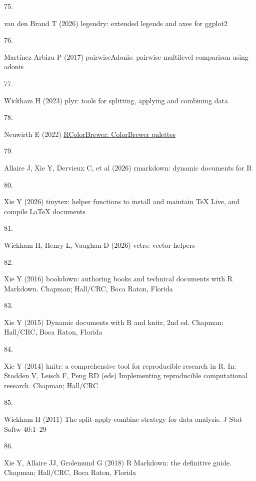 \documentclass[
  12 pt,
]{article}
\newlength{\cslhangindent}
\newlength{\csllabelwidth}
\newenvironment{CSLReferences}[2] %
 {\begin{list}{}{%
  \setlength{\itemindent}{0pt}
  \setlength{\leftmargin}{0pt}
  \setlength{\parsep}{0pt}
  \ifodd #1
   \setlength{\leftmargin}{\cslhangindent}
   \setlength{\itemindent}{-1\cslhangindent}
  \fi
  \setlength{\itemsep}{#2\baselineskip}}}
 {\end{list}}
\newcommand{\CSLLeftMargin}[1]{\parbox[t]{\csllabelwidth}{\strut#1\strut}}
\newcommand{\CSLRightInline}[1]{\parbox[t]{\linewidth - \csllabelwidth}{\strut#1\strut}}
\begin{document}
\begin{CSLReferences}{0}{0}
\CSLLeftMargin{75. }%
\CSLRightInline{{van den Brand T} (2026) {legendry}: {extended} legends and axes for ggplot2}

\CSLLeftMargin{76. }%
\CSLRightInline{Martinez Arbizu P (2017) pairwiseAdonis: {pairwise} multilevel comparison using adonis}

\CSLLeftMargin{77. }%
\CSLRightInline{Wickham H (2023) {plyr}: {tools} for splitting, applying and combining data}

\CSLLeftMargin{78. }%
\CSLRightInline{Neuwirth E (2022) \href{https://doi.org/10.32614/CRAN.package.RColorBrewer}{RColorBrewer: {ColorBrewer} palettes}}

\CSLLeftMargin{79. }%
\CSLRightInline{Allaire J, Xie Y, Dervieux C, et al (2026) {rmarkdown}: {dynamic} documents for {R}}

\CSLLeftMargin{80. }%
\CSLRightInline{Xie Y (2026) {tinytex}: {helper} functions to install and maintain {TeX Live}, and compile LaTeX documents}

\CSLLeftMargin{81. }%
\CSLRightInline{Wickham H, Henry L, Vaughan D (2026) {vctrs}: {vector} helpers}

\CSLLeftMargin{82. }%
\CSLRightInline{Xie Y (2016) {bookdown}: {authoring} books and technical documents with {R} {Markdown}. Chapman; Hall/CRC, Boca Raton, Florida}

\CSLLeftMargin{83. }%
\CSLRightInline{Xie Y (2015) Dynamic documents with {R} and knitr, 2nd ed. Chapman; Hall/CRC, Boca Raton, Florida}

\CSLLeftMargin{84. }%
\CSLRightInline{Xie Y (2014) {knitr}: {a} comprehensive tool for reproducible research in {R}. In: Stodden V, Leisch F, Peng RD (eds) {Implementing reproducible computational research}. Chapman; Hall/CRC}

\CSLLeftMargin{85. }%
\CSLRightInline{Wickham H (2011) The split-apply-combine strategy for data analysis. J Stat Softw 40:1--29}

\CSLLeftMargin{86. }%
\CSLRightInline{Xie Y, Allaire JJ, Grolemund G (2018) R {Markdown}: {the} definitive guide. Chapman; Hall/CRC, Boca Raton, Florida}


\end{CSLReferences}
\end{document}
